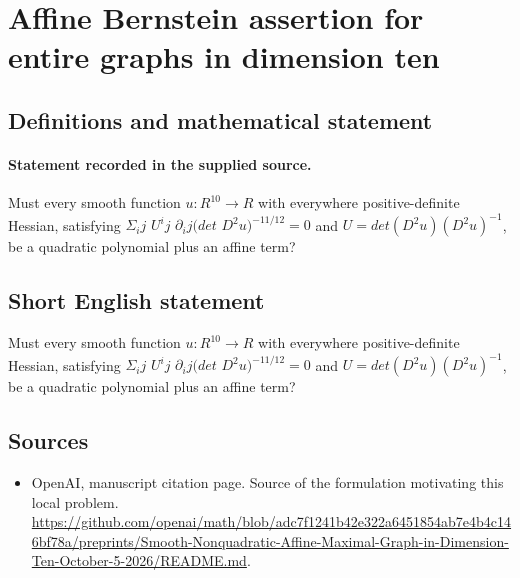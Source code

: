 \documentclass[11pt]{article}
\begin{document}
\section*{Affine Bernstein assertion for entire graphs in dimension ten}\label{statement}
\subsection{Definitions and mathematical statement}
\paragraph{Statement recorded in the supplied source.}
Must every smooth function $u:R^{10}\to R$ with everywhere positive-definite Hessian, satisfying $\Sigma _ij$ $U^ij$ $\partial _ij(det$ $D^{2}u)^{-11/12}=0$ and $U=det(D^{2}u)(D^{2}u)^{-1}$, be a quadratic polynomial plus an affine term?
\subsection{Short English statement}
Must every smooth function $u:R^{10}\to R$ with everywhere positive-definite Hessian, satisfying $\Sigma _ij$ $U^ij$ $\partial _ij(det$ $D^{2}u)^{-11/12}=0$ and $U=det(D^{2}u)(D^{2}u)^{-1}$, be a quadratic polynomial plus an affine term?
\subsection{Sources}
\begin{itemize}
\item[S1] OpenAI, manuscript citation page. Source of the formulation motivating this local problem.
\url{https://github.com/openai/math/blob/adc7f1241b42e322a6451854ab7e4b4c146bf78a/preprints/Smooth-Nonquadratic-Affine-Maximal-Graph-in-Dimension-Ten-October-5-2026/README.md}.
\end{itemize}
\end{document}
